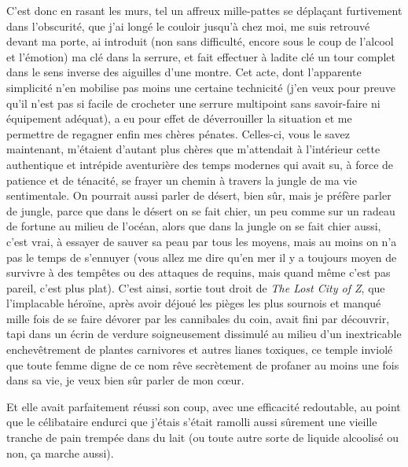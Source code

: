 C’est donc en rasant les murs, tel un affreux mille-pattes se déplaçant furtivement dans l’obscurité, que j’ai longé le couloir jusqu’à chez moi, me suis retrouvé devant ma porte, ai introduit (non sans difficulté, encore sous le coup de l’alcool et l’émotion) ma clé dans la serrure, et fait effectuer à ladite clé un tour complet dans le sens inverse des aiguilles d’une montre. Cet acte, dont l’apparente simplicité n’en mobilise pas moins une certaine technicité (j’en veux pour preuve qu’il n’est pas si facile de crocheter une serrure multipoint sans savoir-faire ni équipement adéquat), a eu pour effet de déverrouiller la situation et me permettre de regagner enfin mes chères pénates. Celles-ci, vous le savez maintenant, m’étaient d’autant plus chères que m’attendait à l’intérieur cette authentique et intrépide aventurière des temps modernes qui avait su, à force de patience et de ténacité, se frayer un chemin à travers la jungle de ma vie sentimentale. On pourrait aussi parler de désert, bien sûr, mais je préfère parler de jungle, parce que dans le désert on se fait chier, un peu comme sur un radeau de fortune au milieu de l’océan, alors que dans la jungle on se fait chier aussi, c’est vrai, à essayer de sauver sa peau par tous les moyens, mais au moins on n’a pas le temps de s’ennuyer (vous allez me dire qu’en mer il y a toujours moyen de survivre à des tempêtes ou des attaques de requins, mais quand même c’est pas pareil, c’est plus plat). C’est ainsi, sortie tout droit de \textit{The Lost City of Z}, que l’implacable héroïne, après avoir déjoué les pièges les plus sournois et manqué mille fois de se faire dévorer par les cannibales du coin, avait fini par découvrir, tapi dans un écrin de verdure soigneusement dissimulé au milieu d’un inextricable enchevêtrement de plantes carnivores et autres lianes toxiques, ce temple inviolé que toute femme digne de ce nom rêve secrètement de profaner au moins une fois dans sa vie, je veux bien sûr parler de mon cœur.

Et elle avait parfaitement réussi son coup, avec une efficacité redoutable, au point que le célibataire endurci que j’étais s’était ramolli aussi sûrement une vieille tranche de pain trempée dans du lait (ou toute autre sorte de liquide alcoolisé ou non, ça marche aussi).

